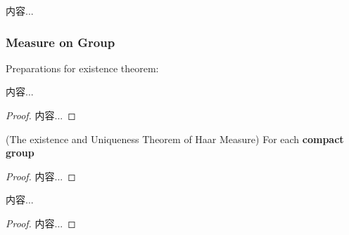 \documentclass[Total.tex]{subfiles}
\begin{document}
			\begin{example}
				内容...
			\end{example}
			\subsubsection{Measure on Group}
				Preparations for existence theorem:
				\begin{lemma}
					内容...
				\end{lemma}
				\begin{proof}
					内容...
				\end{proof}
				
				
				\begin{theorem}
					(The existence and Uniqueness Theorem of Haar Measure) For each \textbf{compact group}
				\end{theorem}
				\begin{proof}
					内容...
				\end{proof}
				
				\begin{corollary}
					内容...
				\end{corollary}
				\begin{proof}
					内容...
				\end{proof}
\end{document}
